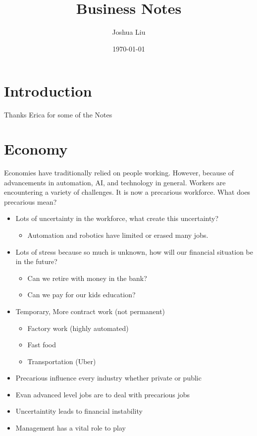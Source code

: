 \documentclass[11pt]{article}
\title{Business Notes}
\author{Joshua Liu}
\date{\today}
\begin{document}
\maketitle

\section{Introduction}
Thanks Erica for some of the Notes

\section{Economy}
Economies have traditionally relied on people working. However, because of advancements in automation, AI, and technology in general. Workers are encountering a variety of challenges. It is now a precarious workforce. What does precarious mean?
\begin{itemize}
    \item Lots of uncertainty in the workforce, what create this uncertainty?
    \begin{itemize}
        \item Automation and robotics have limited or erased many jobs.
    \end{itemize}
    \item Lots of stress because so much is unknown, how will our financial situation be in the future?
    \begin{itemize}
        \item Can we retire with money in the bank?
        \item Can we pay for our kids education?
    \end{itemize}
    \item Temporary, More contract work (not permanent)
    \begin{itemize}
        \item Factory work (highly automated)
        \item Fast food
        \item Transportation (Uber)
    \end{itemize}
\end{itemize}

\begin{itemize}
    \item Precarious influence every industry whether private or public
    \item Evan advanced level jobs are to deal with precarious jobs
    \item Uncertaintity leads to financial instability
    \item Management has a vital role to play
\end{itemize}
\end{document}

